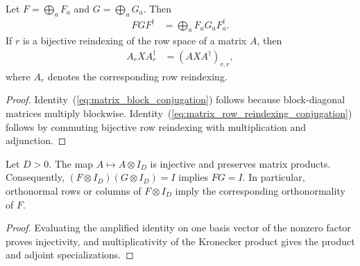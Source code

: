\begin{lemma}
    \label{lem:matrix_block_conjugation_restriction}
    \leanok
    Let $F=\bigoplus_a F_a$ and $G=\bigoplus_a G_a$. Then
    \begin{align}
        FGF^\dagger & =\bigoplus_a F_aG_aF_a^\dagger.
        \label{eq:matrix_block_conjugation}
    \end{align}
    If $r$ is a bijective reindexing of the row space of a matrix
    $A$, then
    \begin{align}
        A_rXA_r^\dagger & =(AXA^\dagger)_{r,r},
        \label{eq:matrix_row_reindexing_conjugation}
    \end{align}
    where $A_r$ denotes the
    corresponding row reindexing.
\end{lemma}
\begin{proof}\leanok
    Identity~(\ref{eq:matrix_block_conjugation}) follows because block-diagonal matrices
    multiply blockwise. Identity~(\ref{eq:matrix_row_reindexing_conjugation}) follows by commuting bijective row
    reindexing with multiplication and adjunction.
\end{proof}

\begin{lemma}
    \label{lem:matrix_kronecker_identity_cancellation}
    \leanok
    Let $D>0$. The map $A\mapsto A\otimes I_D$ is injective and preserves
    matrix products. Consequently,
    $(F\otimes I_D)(G\otimes I_D)=I$ implies $FG=I$.
    In particular, orthonormal rows or columns of $F\otimes I_D$ imply the
    corresponding orthonormality of $F$.
\end{lemma}
\begin{proof}\leanok
    Evaluating the amplified identity on one basis vector of the nonzero
    factor proves injectivity, and multiplicativity of the Kronecker product
    gives the product and adjoint specializations.
\end{proof}

